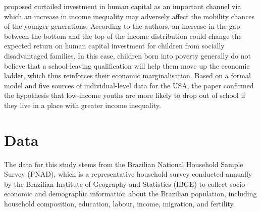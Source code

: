 \documentclass[a4paper, 12pt]{article}
\let\footnote=\endnote
\begin{document}
\citet{kearney2014income} proposed curtailed investment in human capital as an important channel via which an increase in income inequality may adversely affect the mobility chances of the younger generations. According to the authors, an increase in the gap between the bottom and the top of the income distribution could change the expected return on human capital investment for children from socially disadvantaged families. In this case, children born into poverty generally do not believe that a school-leaving qualification will help them move up the economic ladder, which thus reinforces their economic marginalisation. Based on a formal model and five sources of individual-level data for the USA, the paper confirmed the hypothesis that low-income youths are more likely to drop out of school if they live in a place with greater income inequality.













\section{Data} \label{Data}



The data for this study stems from the Brazilian National Household Sample Survey (PNAD), which is a representative household survey conducted annually by the Brazilian Institute of Geography and Statistics (IBGE) to collect socio-economic and demographic information about the Brazilian population, including household composition, education, labour, income, migration, and fertility.
\end{document}
